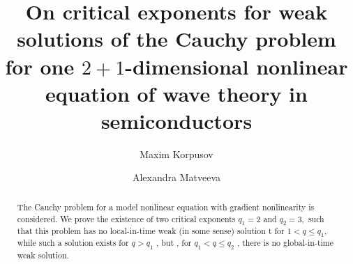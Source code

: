 \begin{englishtitle} %
\title{On critical exponents for weak solutions of the Cauchy problem for one $2+1$-dimensional nonlinear equation of wave theory in semiconductors}
\author{Maxim Korpusov  \and  Alexandra Matveeva
}
\maketitle

\begin{abstract}

The Cauchy problem for a model nonlinear equation with gradient nonlinearity is considered.
We prove the existence of two critical exponents  $q_1=2$ and $q_2=3,$  such that this problem has no local-in-time weak (in some sense) solution  t for $1<q\leqslant q_1$,  while such a solution exists for  $q>q_1$ , but , for $q_1<q\leqslant q_2$ , there is no global-in-time weak solution.

\end{abstract}
\end{englishtitle}


\iffalse
%
%


\documentclass[12pt]{llncs}


\usepackage{iftex}

\ifPDFTeX
\usepackage[T2A]{fontenc}
\usepackage[utf8]{inputenc} %
\usepackage[english,russian]{babel}
\usepackage[tbtags]{amsmath}
\usepackage{amsfonts,amssymb,mathrsfs,amscd}
\fi

